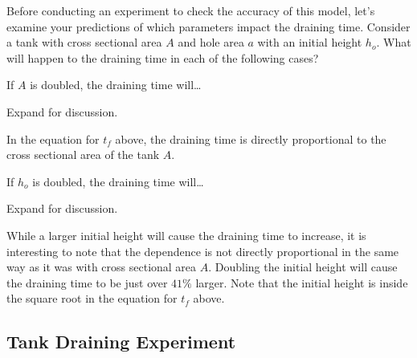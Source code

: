 \documentclass{ximera}
\begin{document}
Before conducting an experiment to check the accuracy of this model, let’s examine your predictions of which parameters impact the draining time.  Consider a tank with cross sectional area $A$ and hole area $a$ with an initial height $h_o$.  What will happen to the draining time in each of the following cases?  

\begin{question}\label{quest:guessGraph}
If $A$ is doubled, the draining time will…
\begin{multipleChoice}
\end{multipleChoice}
\end{question}
Expand for discussion.
\begin{expandable}
    In the equation for $t_f$ above, the draining time is directly proportional to the cross sectional area of the tank $A$.
 \end{expandable}

\begin{question}\label{quest:guessGraph}
If $h_o$ is doubled, the draining time will…
\begin{multipleChoice}
\end{multipleChoice}
\end{question}
Expand for discussion.
\begin{expandable}
    While a larger initial height will cause the draining time to increase, it is interesting to note that the dependence is not directly proportional in the same way as it was with cross sectional area $A$.  Doubling the initial height will cause the draining time to be just over $41\%$ larger.  Note that the initial height is inside the square root in the equation for $t_f$ above. 
 \end{expandable}
 
\subsection*{Tank Draining Experiment}
 
\end{document}
